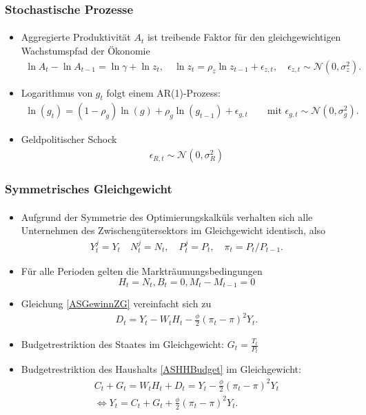 \documentclass[10pt]{beamer}  %
\begin{document}
\begin{frame}
\frametitle{Stochastische Prozesse}\framesubtitle{}
\begin{itemize}
  \item Aggregierte Produktivit\"{a}t $A_t$ ist treibende Faktor f\"{u}r den gleichgewichtigen Wachstumspfad der \"{O}konomie
\begin{align}\label{ASSchockProductivity}
  \ln A_t - \ln A_{t-1}= \ln \gamma  + \ln z_t, \quad \ln z_t = \rho_z \ln z_{t-1} + \epsilon_{z,t}, \quad \epsilon_{z,t} \sim \mathcal{N}(0, \sigma_{z}^2).
\end{align}
\item Logarithmus von $g_t$ folgt einem AR(1)-Prozess:
\begin{align}\label{ASSchockGovt}
\ln(g_t) = (1-\rho_g)\ln(g) + \rho_g \ln(g_{t-1}) + \epsilon_{g,t} \qquad \text{mit } \epsilon_{g,t} \sim \mathcal{N}(0,\sigma_g^2).
\end{align}
\item Geldpolitischer Schock
\begin{align}
  \epsilon_{R,t} \sim \mathcal{N}(0,\sigma_R^2)
\end{align}
\end{itemize}
\end{frame}



\begin{frame}
\frametitle{Symmetrisches Gleichgewicht}\framesubtitle{}
\begin{itemize}
  \item Aufgrund der Symmetrie des Optimierungskalk\"{u}ls verhalten sich alle Unternehmen des Zwischeng\"{u}tersektors im Gleichgewicht identisch, also
\begin{align*}
Y_t^j=Y_t\quad N_t^j=N_t,\quad P_t^j=P_t,\quad  \pi_t = P_t/P_{t-1}.
\end{align*}
  \item F\"{u}r alle Perioden gelten die Marktr\"{a}umungsbedingungen $$H_t=N_t, B_t=0, M_t-M_{t-1}=0$$
  \item Gleichung \eqref{ASGewinnZG} vereinfacht sich zu
  \begin{align*}
  D_t = Y_t -W_t H_t - \frac{\phi}{2}\left(\pi_t - \pi\right)^2 Y_t.
\end{align*}
\item Budgetrestriktion des Staates im Gleichgewicht: $G_t=\frac{T_t}{P_t}$
\item Budgetrestriktion des Haushalts \eqref{ASHHBudget} im Gleichgewicht:
\begin{eqnarray}
  C_t + G_t= W_t H_t + D_t= Y_t - \frac{\phi}{2}\left(\pi_t - \pi\right)^2 Y_t \nonumber\\
  \Leftrightarrow Y_t = C_t + G_t + \frac{\phi}{2} \left(\pi_t -\pi \right)^2 Y_t. \label{ASBudgetVereinfacht}
\end{eqnarray}
\end{itemize}
\end{frame}
\end{document}
